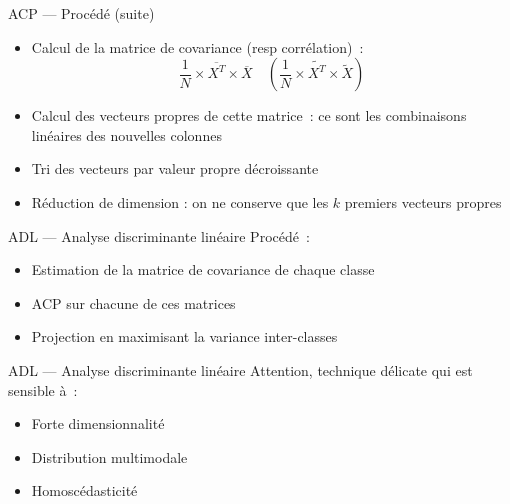 \begin{frame}{ACP --- Procédé (suite)}
  \begin{itemize}
    \item Calcul de la matrice de covariance (resp corrélation)~:
      \[
      \frac{1}{N} \times \overline{X^T} \times \overline{X}
      \quad
      ( \frac{1}{N} \times \widetilde{X^T} \times \widetilde{X} )
      \]
    \item Calcul des vecteurs propres de cette matrice~: ce sont les combinaisons linéaires des nouvelles colonnes
    \item Tri des vecteurs par valeur propre décroissante
    \item Réduction de dimension : on ne conserve que les $k$ premiers vecteurs propres
  \end{itemize}

\end{frame}

\begin{frame}{ADL --- Analyse discriminante linéaire}
  Procédé~:

  \begin{itemize}
    \item Estimation de la matrice de covariance de chaque classe
    \item ACP sur chacune de ces matrices
    \item Projection en maximisant la variance inter-classes
  \end{itemize}
\end{frame}

\begin{frame}{ADL --- Analyse discriminante linéaire}
  Attention, technique délicate qui est sensible à~:

  \begin{itemize}
    \item Forte dimensionnalité
    \item Distribution multimodale
    \item Homoscédasticité
  \end{itemize}
\end{frame}
